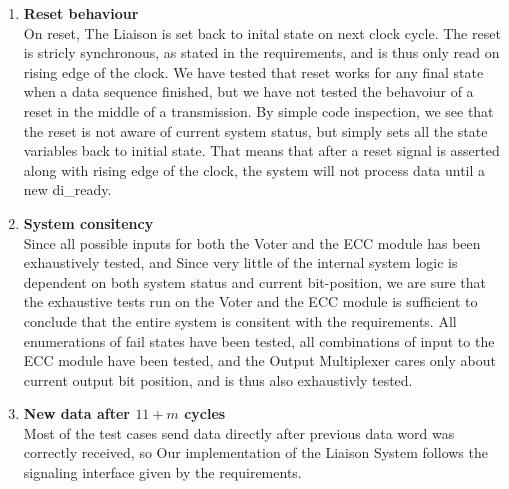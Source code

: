 \begin{enumerate}
\item{\textbf{Reset behaviour}} \hfill\\
    On reset, The Liaison is set back to inital state on next clock cycle. The reset is stricly synchronous,
    as stated in the requirements\cite{task}, and is thus only read on rising edge of the clock. We have
    tested that reset works for any final state when a data sequence finished, but we have not tested the
    behavoiur of a reset in the middle of a transmission. By simple code inspection, we see that the
    reset is not aware of current system status, but simply sets all the state variables back to initial
    state. That means that after a reset signal is asserted along with rising edge of the clock, the system
    will not process data until a new {\ttfamily di\_ready}.

\item{\textbf{System consitency}} \hfill\\
    Since all possible inputs for both the Voter and the ECC module has been exhaustively tested, and 
    Since very little of the internal system logic is dependent on both system status and current bit-position,
    we are sure that the exhaustive tests run on the Voter and the ECC module is sufficient to conclude that 
    the entire system is consitent with the requirements. All enumerations of fail states have been tested, all combinations
    of input to the ECC module have been tested, and the Output Multiplexer cares only about current output bit position,
    and is thus also exhaustivly tested.

\item{\textbf{New data after $11+m$ cycles}} \hfill\\
    Most of the test cases send data directly after previous data word was correctly received, so 
    Our implementation of the Liaison System follows the signaling interface given by the requirements.

\end{enumerate}

